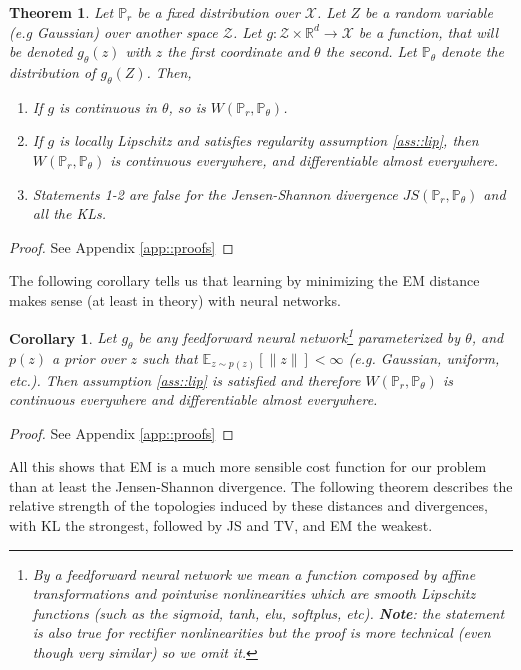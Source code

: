 \documentclass{article} %
\newcommand\EE{\mathbb{E}}
\newcommand\PP{\mathbb{P}}
\newcommand\RR{\mathbb{R}}
\newtheorem{coro}{Corollary}
\newtheorem{theo}{Theorem}
\theoremstyle{definition}
\theoremstyle{definition}
\begin{document}
\begin{theo} \label{theo::regcost} Let $\PP_r$ be a fixed distribution over $\mathcal{X}$.
Let $Z$ be a random variable (e.g Gaussian) over another
space $\mathcal{Z}$. Let $g: \mathcal{Z} \times \RR^d \rightarrow \mathcal{X}$
be a function, that will be denoted $g_\theta(z)$ with $z$ the first coordinate
and $\theta$ the second. Let $\PP_\theta$ denote the distribution of $g_\theta(Z)$.
Then,
\begin{enumerate}
\item If $g$ is continuous in $\theta$, so is $W(\PP_r, \PP_\theta)$.
\item If $g$ is locally Lipschitz and satisfies regularity
assumption \ref{ass::lip},
then $W(\PP_r, \PP_\theta)$ is continuous
everywhere, and differentiable almost everywhere.
\item Statements 1-2 are false for the Jensen-Shannon divergence $JS(\PP_r, \PP_\theta)$
and all the KLs.
\end{enumerate}
\end{theo}
\begin{proof} 
See Appendix \ref{app::proofs}
\end{proof}

The following corollary tells us that learning by minimizing
the EM distance makes sense (at least in theory) with neural networks.
\begin{coro} \label{coro::nnregcost}
Let $g_\theta$ be any feedforward neural network\footnote{By a
feedforward neural network we mean a function composed by
affine transformations and pointwise nonlinearities which are
smooth Lipschitz
functions (such as the sigmoid, tanh, elu, softplus, etc).
\textbf{Note}: the statement is also true for rectifier
nonlinearities but the proof is more
technical (even though very similar) so we omit it.} parameterized by $\theta$, 
and $p(z)$ a prior over $z$ such that $\EE_{z \sim p(z)}[\|z\|] < \infty$ (e.g.
Gaussian, uniform, etc.). Then assumption
\ref{ass::lip} is satisfied and therefore $W(\PP_r, \PP_\theta)$
is continuous everywhere and differentiable almost everywhere.
\end{coro}
\begin{proof}
See Appendix \ref{app::proofs}
\end{proof}

All this shows that EM is a much more sensible
cost function for our problem than at least the Jensen-Shannon
divergence. The following theorem describes the relative strength of
the topologies induced by these distances and divergences, with KL the strongest,
followed by JS and TV, and EM the weakest.
\end{document}
